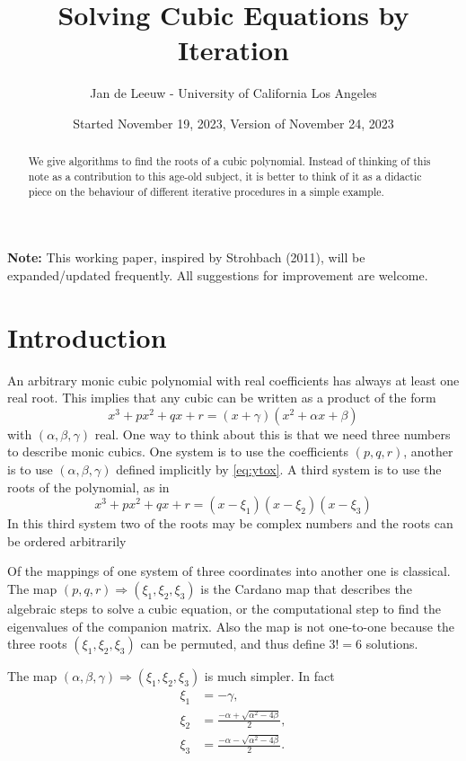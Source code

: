 \documentclass[
  12pt,
]{article}
\title{Solving Cubic Equations by Iteration}
\author{Jan de Leeuw - University of California Los Angeles}
\date{Started November 19, 2023, Version of November 24, 2023}
\begin{document}
\maketitle
\begin{abstract}
We give algorithms to find the roots of a cubic polynomial. Instead of thinking of this note as a contribution to this age-old subject, it is better to think of it as a didactic piece on the behaviour of different iterative procedures in a simple example.
\end{abstract}

{
\setcounter{tocdepth}{3}
\tableofcontents
}
\textbf{Note:}
This working paper, inspired by Strohbach (2011), will be expanded/updated frequently. All suggestions for improvement are welcome.

\section{Introduction}\label{introduction}

An arbitrary monic cubic polynomial with real coefficients has always at least one real root.
This implies that any cubic can be written as a product of the form
\begin{equation}
x^3 + px^2 + qx + r = (x+\gamma)(x^2 + \alpha x +\beta)
\label{eq:ytox}
\end{equation}
with \((\alpha,\beta,\gamma)\) real. One way to think about this is that we need three
numbers to describe monic cubics. One system is to use the coefficients \((p,q,r)\),
another is to use \((\alpha,\beta,\gamma)\) defined implicitly by \eqref{eq:ytox}.
A third system is to use the roots of the polynomial, as in
\begin{equation}
x^3 + px^2 + qx + r = (x-\xi_1)(x-\xi_2)(x-\xi_3)
\label{eq:ytoz}
\end{equation}
In this third system two of the roots may be complex numbers and
the roots can be ordered arbitrarily

Of the mappings of one system of three coordinates into another one is classical.
The map \((p,q,r)\Rightarrow(\xi_1,\xi_2,\xi_3)\) is the Cardano map that
describes the algebraic steps to solve a cubic equation, or the computational
step to find the eigenvalues of the companion matrix. Also the map is not
one-to-one because the three roots \((\xi_1,\xi_2,\xi_3)\) can be permuted, and thus
define \(3!=6\) solutions.

The map \((\alpha,\beta,\gamma)\Rightarrow(\xi_1,\xi_2,\xi_3)\) is much simpler.
In fact
\begin{align}
\xi_1&=-\gamma,\\
\xi_2&=\frac{-\alpha+\sqrt{\alpha^2-4\beta}}{2},\\
\xi_3&=\frac{-\alpha-\sqrt{\alpha^2-4\beta}}{2}.
\end{align}
\end{document}
